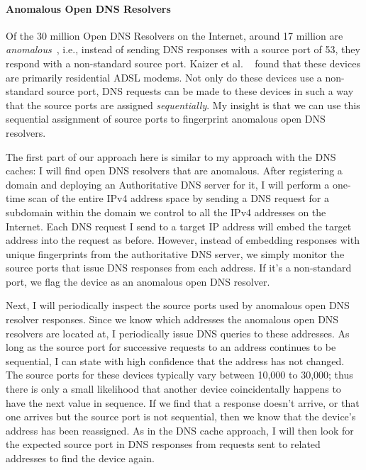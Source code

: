 \paragraph{Anomalous Open DNS Resolvers}

Of the 30 million Open DNS Resolvers on the Internet, around 17
million are \emph{anomalous}~\cite{anomalousdns}, i.e.,
instead of sending DNS responses with a source port of 53, they
respond with a non-standard source port. Kaizer et al. ~\cite{anomalousdns} found that
these devices are primarily residential ADSL modems. Not only do these
devices use a non-standard source port, DNS requests can be made to
these devices in such a way that the source ports are assigned
\emph{sequentially}. My insight is that we can use this sequential
assignment of source ports to fingerprint anomalous open DNS resolvers.

The first part of our approach here is similar to my approach with
the DNS caches: I will find open DNS resolvers that are anomalous. After registering a domain and deploying an Authoritative DNS server
for it, I will perform a one-time scan of the entire IPv4
address space by sending a DNS request for a subdomain within the
domain we control to all the IPv4 addresses on the Internet. Each DNS
request I send to a target IP address will embed the target address
into the request as before. However, instead of embedding responses with
unique fingerprints from the authoritative DNS server, we simply
monitor the source ports that issue DNS responses from each
address. If it's a non-standard port, we flag the device as an
anomalous open DNS resolver.

Next, I will periodically inspect the source ports used by anomalous
open DNS resolver responses. Since we know which
  addresses the anomalous open DNS resolvers are located at, I
  periodically issue DNS queries to these addresses. As long as the
  source port for successive requests to an address continues to be
  sequential, I can state with high confidence that the address has
  not changed. The source ports for these devices typically vary
  between 10,000 to 30,000; thus there is only a small likelihood that
  another device coincidentally happens to have the next value in
  sequence. If we find that a response doesn't arrive, or that one
  arrives but the source port is not sequential, then we know that the
  device's address has been reassigned. As in the DNS cache approach,
  I will then look for the expected source port in DNS responses from
  requests sent to related addresses to find the device again.


